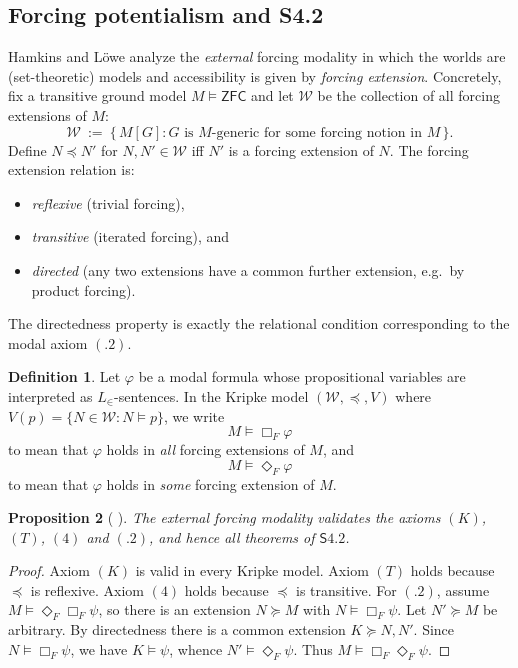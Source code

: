 \documentclass[11pt]{amsart}
\theoremstyle{definition}
\newtheorem{definition}{Definition}[section]
\theoremstyle{plain}
\newtheorem{proposition}[definition]{Proposition}
\begin{document}
\subsection{Forcing potentialism and S4.2}\label{subsec:forcing-S4.2}

Hamkins and L\"owe \cite{HamkinsLowe} analyze the \emph{external} forcing modality in which the worlds
are (set-theoretic) models and accessibility is given by \emph{forcing extension}.
Concretely, fix a transitive ground model $M\models\mathsf{ZFC}$ and let $\mathcal W$ be the collection
of all forcing extensions of $M$:
\[
\mathcal W\ :=\ \{\,M[G]: \text{$G$ is $M$-generic for some forcing notion in $M$}\,\}.
\]
Define $N\preccurlyeq N'$ for $N,N'\in\mathcal W$ iff $N'$ is a forcing extension of $N$.
The forcing extension relation is:
\begin{itemize}[leftmargin=2em]
\item \emph{reflexive} (trivial forcing),
\item \emph{transitive} (iterated forcing), and
\item \emph{directed} (any two extensions have a common further extension, e.g.\ by product forcing).
\end{itemize}
The directedness property is exactly the relational condition corresponding to the modal axiom $(.2)$.

\begin{definition}\label{def:external-forcing-modality}
Let $\varphi$ be a modal formula whose propositional variables are interpreted as $L_{\in}$-sentences.
In the Kripke model $(\mathcal W,\preccurlyeq,V)$ where $V(p)=\{N\in\mathcal W: N\models p\}$, we write
\[
M\models \Box_F \varphi
\]
to mean that $\varphi$ holds in \emph{all} forcing extensions of $M$, and
\[
M\models \Diamond_F \varphi
\]
to mean that $\varphi$ holds in \emph{some} forcing extension of $M$.
\end{definition}

\begin{proposition}[\cite{HamkinsLowe} ]\label{prop:S4.2-soundness}
The external forcing modality validates the axioms $(K)$, $(T)$, $(4)$ and $(.2)$, and hence all
theorems of $\mathsf{S4.2}$.
\end{proposition}

\begin{proof}
Axiom $(K)$ is valid in every Kripke model.
Axiom $(T)$ holds because $\preccurlyeq$ is reflexive.
Axiom $(4)$ holds because $\preccurlyeq$ is transitive.
For $(.2)$, assume $M\models \Diamond_F\Box_F\psi$, so there is an extension $N\succeq M$ with
$N\models \Box_F\psi$. Let $N'\succeq M$ be arbitrary. By directedness there is a common extension
$K\succeq N,N'$. Since $N\models \Box_F\psi$, we have $K\models\psi$, whence $N'\models\Diamond_F\psi$.
Thus $M\models \Box_F\Diamond_F\psi$.
\end{proof}
\end{document}
